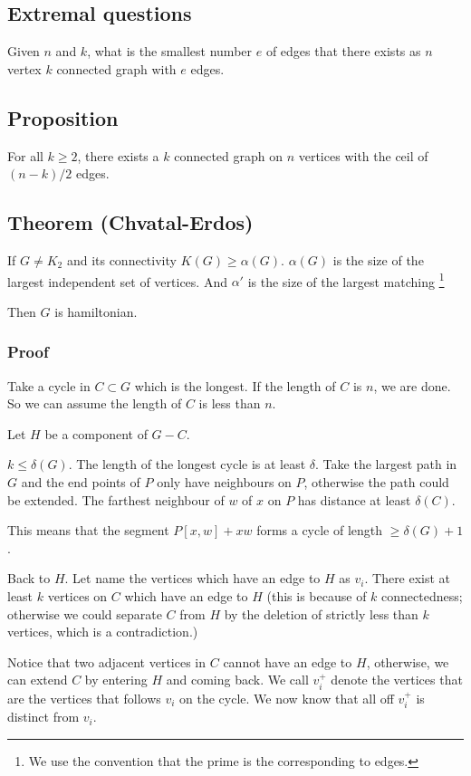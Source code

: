 \documentclass[11pt]{article}
\begin{document}
\subsection{Extremal questions}
\label{sec:orgf7da676}
Given \(n\) and \(k\), what is the smallest number \(e\) of edges that there exists
as \(n\) vertex \(k\) connected  graph with \(e\) edges.
\subsection{Proposition}
\label{sec:orgd9c6c7c}
For all \(k \ge 2\), there exists a \(k\) connected graph on \(n\) vertices with
the ceil of \((n-k)/2\) edges.
\subsection{Theorem (Chvatal-Erdos)}
\label{sec:org8d7f078}
If \(G \neq K_2\) and its connectivity \(K(G) \ge \alpha(G)\). \(\alpha(G)\) is the
size of the largest independent set of vertices. And \(\alpha'\) is the size of
the largest matching \footnote{We use the convention that the prime is the corresponding to edges.}

Then \(G\) is hamiltonian.
\subsubsection{Proof}
\label{sec:orgc3e7892}
Take a cycle in \(C \subset G\) which is the longest. If the length of \(C\) is
\(n\), we are done. So we can assume the length of \(C\) is less than \(n\).

Let \(H\) be a component of \(G -C\).

\(k \le \delta(G)\). The length of the longest cycle is at least \(\delta\).
Take the largest path in \(G\) and the end points of \(P\) only have neighbours
on \(P\), otherwise the path could be extended. The farthest neighbour of \(w\)
of \(x\) on \(P\) has distance at least \(\delta(C)\).

This means that the segment \(P[x, w] + xw\) forms a cycle of length \(\ge
    \delta(G) + 1\).

Back to \(H\). Let name the vertices which have an edge to \(H\) as \(v_i\). There
exist at least \(k\) vertices on \(C\) which have an edge to \(H\) (this is
because of \(k\) connectedness; otherwise we could separate \(C\) from \(H\) by
the deletion of strictly less than \(k\) vertices, which is a contradiction.)

Notice that two adjacent vertices in \(C\) cannot have an edge to \(H\),
otherwise, we can extend \(C\) by entering \(H\) and coming back. We call
\(v_{i}^{+}\) denote the vertices that are the vertices that follows \(v_i\) on
the cycle. We now know that all off \(v_{i}^{+}\) is distinct from \(v_i\).
\end{document}
